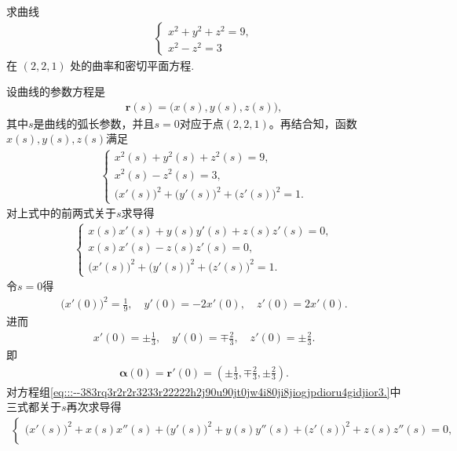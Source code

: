 \documentclass[../../main.tex]{subfiles}%
\begin{document}
\begin{example}
求曲线
\begin{align*}
\begin{cases}
x^2 + y^2 + z^2 = 9, \\
x^2 - z^2 = 3
\end{cases}
\end{align*}
在 $(2,2,1)$ 处的曲率和密切平面方程.
\end{example}
\begin{solution}
设曲线的参数方程是
\begin{align*}
\bm{r}(s) = \big(x(s), y(s), z(s)\big),
\end{align*}
其中$s$是曲线的弧长参数，并且$s=0$对应于点$(2,2,1)$。再结合知，函数$x(s), y(s), z(s)$满足
\begin{align*}
\begin{cases}
x^2(s) + y^2(s) + z^2(s) = 9, \\
x^2(s) - z^2(s) = 3, \\
\big(x'(s)\big)^2 + \big(y'(s)\big)^2 + \big(z'(s)\big)^2 = 1.
\end{cases}
\end{align*}
对上式中的前两式关于$s$求导得
\begin{align}
\begin{cases}
x(s)x'(s) + y(s)y'(s) + z(s)z'(s) = 0, \\
x(s)x'(s) - z(s)z'(s) = 0, \\
\big(x'(s)\big)^2 + \big(y'(s)\big)^2 + \big(z'(s)\big)^2 = 1.
\end{cases}
\label{eq:::--383rq3r2r2r3233r22222h2j90u90jt0jw4i80ji8jiogjpdioru4gidjior3.}
\end{align}
令$s=0$得
\begin{align*}
\big(x'(0)\big)^2 = \frac{1}{9}, \quad y'(0) = -2x'(0), \quad z'(0) = 2x'(0).
\end{align*}
进而
\begin{align*}
x'(0) = \pm \frac{1}{3}, \quad y'(0) = \mp \frac{2}{3}, \quad z'(0) = \pm \frac{2}{3}.
\end{align*}
即
\begin{align*}
\bm{\alpha}(0) = \bm{r}'(0) = \left( \pm \frac{1}{3}, \mp \frac{2}{3}, \pm \frac{2}{3} \right).
\end{align*}
对方程组\eqref{eq:::--383rq3r2r2r3233r22222h2j90u90jt0jw4i80ji8jiogjpdioru4gidjior3.}中三式都关于$s$再次求导得
\begin{align*}
\begin{cases}
\big(x'(s)\big)^2 + x(s)x''(s) + \big(y'(s)\big)^2 + y(s)y''(s) + \big(z'(s)\big)^2 + z(s)z''(s) = 0, \\

\end{cases}
\end{align*}
\end{solution}
\end{document}
